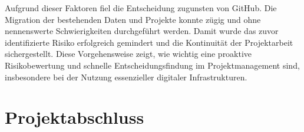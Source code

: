 \documentclass[12pt,oneside]{article}
\begin{document}
Aufgrund dieser Faktoren fiel die Entscheidung zugunsten von GitHub. Die Migration der bestehenden Daten und Projekte konnte zügig und ohne nennenswerte Schwierigkeiten durchgeführt werden. Damit wurde das zuvor identifizierte Risiko erfolgreich gemindert und die Kontinuität der Projektarbeit sichergestellt.
Diese Vorgehensweise zeigt, wie wichtig eine proaktive Risikobewertung und schnelle Entscheidungsfindung im Projektmanagement sind, insbesondere bei der Nutzung essenzieller digitaler Infrastrukturen.


\section{Projektabschluss}



\clearpage



\appendix
\end{document}
